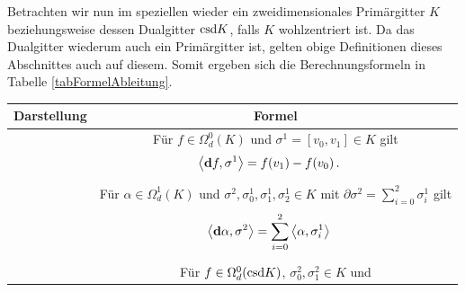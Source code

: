   \begin{bemerkung}
    Betrachten wir nun im speziellen wieder ein zweidimensionales Primärgitter \( K \) beziehungsweise dessen Dualgitter \( \text{csd} K \), 
    falls \( K \) wohlzentriert ist.
    Da das Dualgitter wiederum auch ein Primärgitter ist, gelten obige Definitionen dieses Abschnittes auch auf diesem. 
    Somit ergeben sich die Berechnungsformeln in Tabelle \ref{tabFormelAbleitung}.
    \begin{table}[htbp]
    \begin{tabular}{|c|c|} \hline
      Darstellung & Formel \\\hline
      \begin{minipage}[c]{0.29\textwidth}
        \centering
      \end{minipage} &
      \begin{minipage}[c]{0.69\textwidth}
        Für \( f\in\Omega_{d}^{0}(K) \) und \( \sigma^{1}=\left[ v_{0}, v_{1} \right]\in K \) gilt
        {\begin{align}
          \label{eqAbleitungKante}
          \left\langle \mathbf{d} f , \sigma^{1} \right\rangle &= f(v_{1}) - f(v_{0}) \,\text{.}
        \end{align}}
      \end{minipage} \\\hline
      \begin{minipage}[c]{0.29\textwidth}
        \centering
      \end{minipage} &
      \begin{minipage}[c]{0.69\textwidth}
      Für \( \alpha\in\Omega_{d}^{1}(K) \) und \( \sigma^{2},\sigma^{1}_{0},\sigma^{1}_{1},\sigma^{1}_{2} \in K \) 
      mit \( \partial\sigma^{2} = \sum_{i=0}^{2} \sigma^{1}_{i} \) gilt
        {\begin{align}
          \left\langle \mathbf{d} \alpha , \sigma^{2} \right\rangle &= \sum_{i=0}^{2} \left\langle \alpha, \sigma_{i}^{1}\right\rangle
        \end{align}}
      \end{minipage} \\\hline
      \begin{minipage}[c]{0.29\textwidth}
        \centering
      \end{minipage} &
      \begin{minipage}[c]{0.69\textwidth}
        Für \( f\in\Omega_{d}^{0}(\text{csd} K) \), \( \sigma^{2}_{0}, \sigma^{2}_{1} \in K \) und 

\end{minipage}
\end{tabular}
\end{table}
\end{bemerkung}
